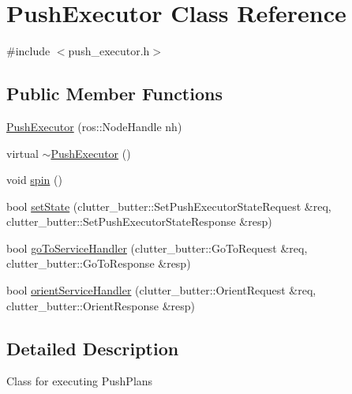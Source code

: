\hypertarget{classPushExecutor}{\section{Push\-Executor Class Reference}
\label{classPushExecutor}
}


{\ttfamily \#include $<$push\-\_\-executor.\-h$>$}

\subsection*{Public Member Functions}
\begin{DoxyCompactItemize}
\item 
\hyperlink{classPushExecutor_a8581db529bb129db624246b03ef1dd76}{Push\-Executor} (ros\-::\-Node\-Handle nh)
\item 
virtual \hyperlink{classPushExecutor_ae06e824bc0a5c5d1aa2852e0a4f0315f}{$\sim$\-Push\-Executor} ()
\item 
void \hyperlink{classPushExecutor_a2ed28d59825052dba2a89069710a1f1b}{spin} ()
\item 
bool \hyperlink{classPushExecutor_a29f3471ee5383b19d1c6184db62de64a}{set\-State} (clutter\-\_\-butter\-::\-Set\-Push\-Executor\-State\-Request \&req, clutter\-\_\-butter\-::\-Set\-Push\-Executor\-State\-Response \&resp)
\item 
bool \hyperlink{classPushExecutor_adefbc98c68687a515825d70d6c2a401d}{go\-To\-Service\-Handler} (clutter\-\_\-butter\-::\-Go\-To\-Request \&req, clutter\-\_\-butter\-::\-Go\-To\-Response \&resp)
\item 
bool \hyperlink{classPushExecutor_ace047e15af6c8ac75ffeb9f1e4d27f56}{orient\-Service\-Handler} (clutter\-\_\-butter\-::\-Orient\-Request \&req, clutter\-\_\-butter\-::\-Orient\-Response \&resp)
\end{DoxyCompactItemize}


\subsection{Detailed Description}
Class for executing Push\-Plans 

